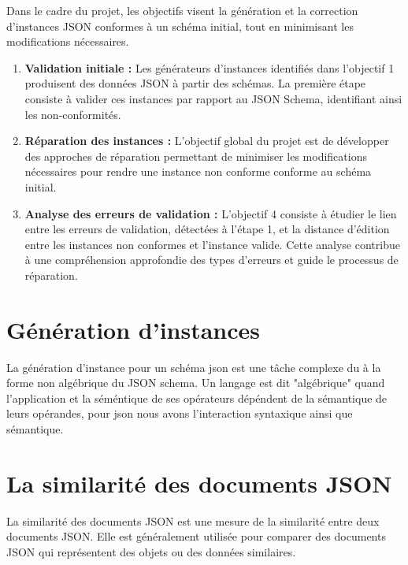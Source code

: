             Dans le cadre du projet, les objectifs visent la génération et la correction d'instances JSON conformes à un schéma initial, tout en minimisant les modifications nécessaires. 

            \begin{enumerate}
                \item \textbf{Validation initiale :} Les générateurs d'instances identifiés dans l'objectif 1 produisent des données JSON à partir des schémas. La première étape consiste à valider ces instances par rapport au JSON Schema, identifiant ainsi les non-conformités.
                
                \item \textbf{Réparation des instances :} L'objectif global du projet est de développer des approches de réparation permettant de minimiser les modifications nécessaires pour rendre une instance non conforme conforme au schéma initial.
                
                \item \textbf{Analyse des erreurs de validation :} L'objectif 4 consiste à étudier le lien entre les erreurs de validation, détectées à l'étape 1, et la distance d'édition entre les instances non conformes et l'instance valide. Cette analyse contribue à une compréhension approfondie des types d'erreurs et guide le processus de réparation.
            \end{enumerate}

    \section{Génération d'instances}
        La génération d'instance pour un schéma json est une tâche complexe du à la forme non algébrique du JSON schema. 
        Un langage est dit "algébrique" quand l'application et la séméntique de ses opérateurs dépéndent de la sémantique de leurs opérandes, pour json nous avons l'interaction syntaxique ainsi que sémantique.\cite{not_elimination}
    
    \section{La similarité des documents JSON}
        La similarité des documents JSON est une mesure de la similarité entre deux documents JSON. Elle est généralement utilisée pour comparer des documents JSON qui représentent des objets ou des données similaires.
